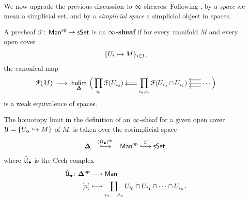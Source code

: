 We now upgrade the previous discussion to $\operatorname{\infty}$-sheaves. Following
\cite{BBEP24}, by a \emph{space} we mean a simplicial set, and by a
\emph{simplicial space} a simplicial object in spaces.

\begin{definition}\label{ch3:: def: infinity-sheaf}
  {\cite[Definition~2.15]{BBEP24}}
  A presheaf $\mathcal F\colon \operatorname{\sf Man}^{\mathsf{op}}\to\operatorname{\sf sSet}$ is an \textbf{$\operatorname{\infty}$-sheaf} if for every manifold $M$ and every open cover \[\{U_i\hookrightarrow M\}_{i\in I},\] the  canonical map
  \begin{equation}
    \cF(M)\;\longra\;
    \hoLimit[\bDelta]\Big(
      \prod_{i_0}\cF(U_{i_0})
      \doubleleftarrow
      \prod_{i_0,i_1}\cF(U_{i_0}\cap U_{i_1})
      \tripleleftarrow\cdots
    \Big)
   \end{equation}
  is a weak equivalence of spaces.
\end{definition}


\begin{remark}
    The homotopy limit in the definition of an $\operatorname{\infty}$-sheaf for a given open cover $\mathcal U = \{U_\alpha \hookrightarrow M\}$ of $M$, is taken over the cosimplicial space 
    \begin{equation}
        \bDelta \xlonghookra{\,\,\,\,\, (\check{\cU}_{\bullet})^{\op}\,\,\,\,\,\,} \man^\op \xlonghookra{\,\, \cF \,\,} \sset,
    \end{equation} 
    where $\check{\mathcal U}_{\bullet}$ is the Cech complex
    \begin{align}
        \check{\mathcal U}_{\bullet} \colon \mathbf\Delta^{\mathsf{op}} &\longrightarrow \operatorname{\sf Man} \\
        [n] &\longmapsto \coprod_{i_{0},\cdots,i_{n}} U_{i_{0}}\cap U_{i_{1}} \cap \cdots \cap U_{i_{n}}.
    \end{align}
\end{remark}

